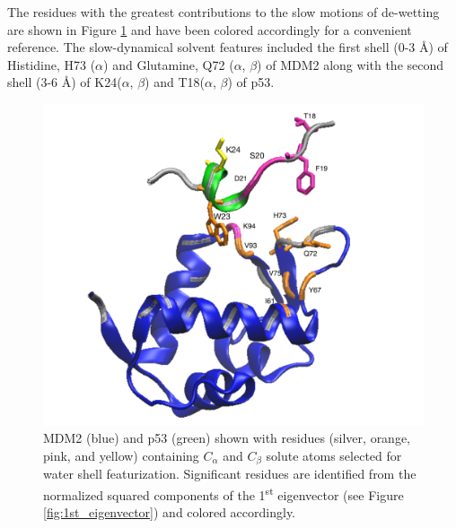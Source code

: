The residues with the greatest contributions to the slow motions of de-wetting are shown in Figure \ref{fig:atom_indices} and have been colored accordingly for a convenient reference.  The slow-dynamical solvent features included the first shell (0-3 Å) of Histidine, H73 ($\alpha$) and Glutamine, Q72 ($\alpha$, $\beta$) of MDM2 along with the second shell (3-6 Å) of K24($\alpha$, $\beta$) and T18($\alpha$, $\beta$) of p53.




\begin{figure}[h!]
\centering
\includegraphics[scale=0.5]{Figures/Structure/Atom_indices_with_1st_eigenvector_sel.pdf}
\caption{MDM2 (blue) and p53 (green) shown with residues (silver, orange, pink, and yellow) containing $C_{\alpha}$ and $C_{\beta}$ solute atoms selected for water shell featurization. Significant residues are identified from the normalized squared components of the 1\textsuperscript{st} eigenvector (see Figure \ref{fig:1st_eigenvector}) and colored accordingly.}
\label{fig:atom_indices}
\end{figure}


